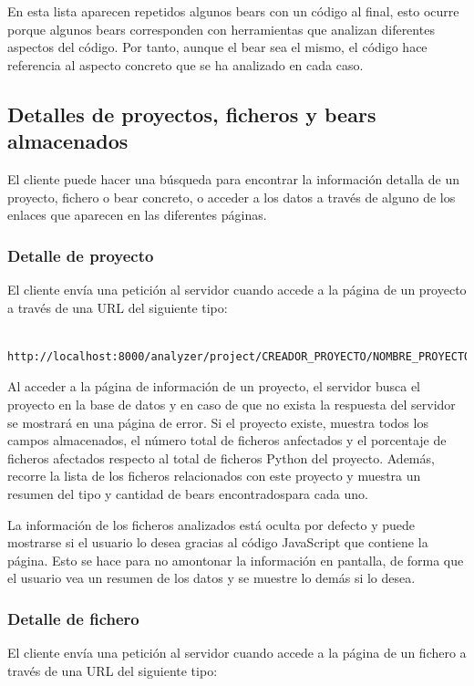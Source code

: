 \documentclass[a4paper, 12pt]{book}
\begin{document}
En esta lista aparecen repetidos algunos bears con un código al final, esto ocurre porque algunos bears corresponden con herramientas que analizan diferentes aspectos del código. Por tanto, aunque el bear sea el mismo, el código hace referencia al aspecto concreto que se ha analizado en cada caso.

\subsection{Detalles de proyectos, ficheros y bears almacenados}
\label{sec:seccion12.4}
El cliente puede hacer una búsqueda para encontrar la información detalla de un proyecto, fichero o bear concreto, o acceder a los datos a través de alguno de los enlaces que aparecen en las diferentes páginas.

\subsubsection{Detalle de proyecto}
\label{sec:section12.4.1}
El cliente envía una petición al servidor cuando accede a la página de un proyecto a través de una URL del siguiente tipo:

{\footnotesize
\begin{verbatim}
    http://localhost:8000/analyzer/project/CREADOR_PROYECTO/NOMBRE_PROYECTO
\end{verbatim}
}

Al acceder a la página de información de un proyecto, el servidor busca el proyecto en la base de datos y en caso de que no exista la respuesta del servidor se mostrará en una página de error. Si el proyecto existe, muestra todos los campos almacenados, el número total de ficheros anfectados y el porcentaje de ficheros afectados respecto al total de ficheros Python del proyecto. Además, recorre la lista de los ficheros relacionados con este proyecto y muestra un resumen del tipo y cantidad de bears encontradospara cada uno.

La información de los ficheros analizados está oculta por defecto y puede mostrarse si el usuario lo desea gracias al código JavaScript que contiene la página. Esto se hace para no amontonar la información en pantalla, de forma que el usuario vea un resumen de los datos y se muestre lo demás si lo desea.

\subsubsection{Detalle de fichero}
\label{sec:section12.4.2}
El cliente envía una petición al servidor cuando accede a la página de un fichero a través de una URL del siguiente tipo:
\end{document}
